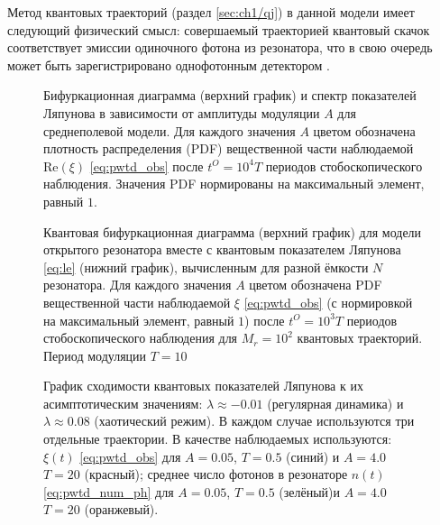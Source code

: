 Метод квантовых траекторий (раздел \cref{sec:ch1/qj}) в данной модели имеет следующий физический смысл: совершаемый траекторией квантовый скачок соответствует эмиссии одиночного фотона из резонатора, что в свою очередь может быть зарегистрировано однофотонным детектором \cite{Delteil2014, Cohen2015}.

\begin{figure}[h]
	\caption[Бифуркационная диаграмма и спектр показателей Ляпунова в зависимости от амплитуды модуляции в среднеполевой модели квантового резонатора с утечкой]{
		Бифуркационная диаграмма (верхний график) и спектр показателей Ляпунова \cite{Benettin1976} в зависимости от амплитуды модуляции $A$ для среднеполевой модели. Для каждого значения $A$ цветом обозначена плотность распределения (PDF) вещественной части наблюдаемой $\text{Re}(\xi)$ \cref{eq:pwtd_obs} после \(t^O = 10^4T\) периодов стобоскопического наблюдения. Значения PDF нормированы на максимальный элемент, равный $1$.
	}
	\label{fig:pwtd_1}
\end{figure}

\begin{figure}[h]
	\caption[Квантовая бифуркационная диаграмма для модели открытого резонатора вместе с квантовым показателем Ляпунова]{
		Квантовая бифуркационная диаграмма (верхний график) для модели открытого резонатора вместе с квантовым показателем Ляпунова \cref{eq:le} (нижний график), вычисленным для разной ёмкости $N$ резонатора. 
		Для каждого значения $A$ цветом обозначена PDF вещественной части наблюдаемой $\xi$ \cref{eq:pwtd_obs} (с нормировкой на максимальный элемент, равный $1$) после \(t^O = 10^3T\) периодов стобоскопического наблюдения для $M_r=10^2$ квантовых траекторий. Период модуляции $T=10$
	}
	\label{fig:pwtd_2}
\end{figure}

\begin{figure}[h]
	\caption[График сходимости квантовых показателей Ляпунова к их асимптотическим значениям для разных наблюдаемых в модели открытого резонатора]{
		График сходимости квантовых показателей Ляпунова к их асимптотическим значениям: $\lambda \approx -0.01$ (регулярная динамика) и $\lambda \approx 0.08$ (хаотический режим). В каждом случае используются три отдельные траектории.
		В качестве наблюдаемых используются: $\xi(t)$ \cref{eq:pwtd_obs} для $A = 0.05$, $T = 0.5$ (синий) и $A = 4.0$ $T = 20$ (красный); среднее число фотонов в резонаторе $n(t)$ \cref{eq:pwtd_num_ph} для $A = 0.05$, $T = 0.5$ (зелёный)и $A = 4.0$ $T = 20$ (оранжевый).
	}
	\label{fig:pwtd_3}
\end{figure}

